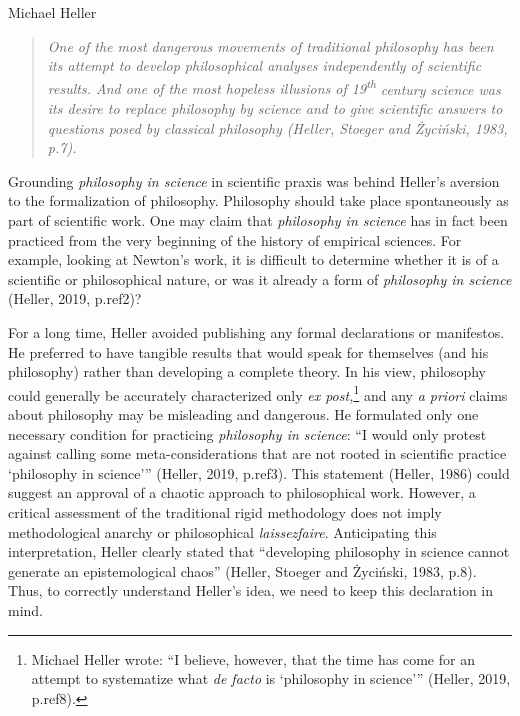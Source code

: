 \begin{artengenv}{Michael Heller}
\begin{quotation}
\textit{One of the most dangerous movements of traditional philosophy has been its attempt to develop philosophical
analyses independently of scientific results. And one of the most hopeless illusions of
19}\textit{\textsuperscript{th}}\textit{ century science was its desire to replace philosophy by science and to give
scientific answers to questions posed by classical philosophy (Heller, Stoeger and Życiński, 1983, p.7).}

\end{quotation}
Grounding \textit{philosophy in science }in scientific praxis was behind Heller’s aversion to the formalization of
philosophy. Philosophy should take place spontaneously as part of scientific work. One may claim that
\textit{philosophy in science }has in fact been practiced from the very beginning of the history of empirical sciences.
For example, looking at Newton’s work, it is difficult to determine whether it is of a scientific or philosophical
nature, or was it already a form of \textit{philosophy in science }(Heller, 2019, p.ref2)?

For a long time, Heller avoided publishing any formal declarations or manifestos. He preferred to have tangible results
that would speak for themselves (and his philosophy) rather than developing a complete theory. In his view, philosophy
could generally be accurately characterized only \textit{ex post,}\footnote{Michael Heller wrote: “I believe, however,
that the time has come for an attempt to systematize what \textit{de facto} is ‘philosophy in science’” (Heller, 2019,
p.ref8).} and any \textit{a priori }claims about philosophy may be misleading and dangerous. He formulated only one
necessary condition for practicing \textit{philosophy in science}: “I would only protest against calling some
meta-considerations that are not rooted in scientific practice ‘philosophy in science’” (Heller, 2019, p.ref3). This
statement (Heller, 1986) could suggest an approval of a chaotic approach to philosophical work. However, a critical
assessment of the traditional rigid methodology does not imply methodological anarchy or philosophical
\emph{laissez}\textstylest{{}-}\emph{faire}. Anticipating this interpretation, Heller clearly stated that “developing
philosophy in science cannot generate an epistemological chaos” (Heller, Stoeger and Życiński, 1983, p.8). Thus, to
correctly understand Heller’s idea, we need to keep this declaration in mind.


\end{artengenv}
